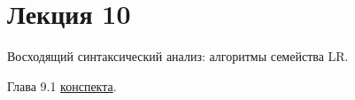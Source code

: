 \section{Лекция 10}
 
Восходящий синтаксический анализ: алгоритмы семейства LR.


Глава 9.1 \href{https://github.com/YaccConstructor/articles/blob/master/InProgress/Formal_langs_CFPQ_course_notes/Formal_lang_CFPQ_course_notes.pdf}{конспекта}.
